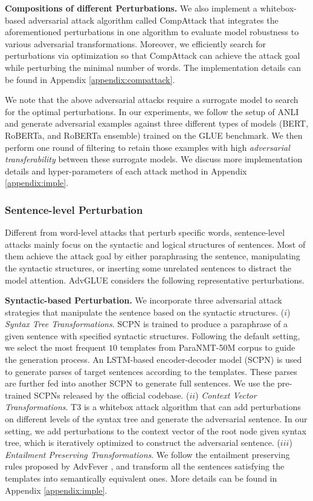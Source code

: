 \documentclass{article}
\newcommand{\method}{AdvGLUE\xspace}
\begin{document}
\textbf{Compositions of different Perturbations.} We also implement a whitebox-based adversarial attack algorithm called CompAttack that integrates the aforementioned perturbations in one algorithm to evaluate model robustness to various adversarial transformations. Moreover, we efficiently search for perturbations via optimization so that CompAttack can achieve the attack goal while perturbing the minimal number of words. The implementation details can be found in Appendix \ref{appendix:compattack}.


We note that the above adversarial attacks require a surrogate model to search for the optimal perturbations. In our experiments, we follow the setup of ANLI \citep{anli} and generate adversarial examples against three different types of  models (BERT, RoBERTa, and RoBERTa ensemble) trained on the GLUE benchmark. 
We then perform one round of filtering to retain those examples with high \textit{adversarial transferability} between these surrogate models. 
We discuss more implementation details and hyper-parameters of each attack method in Appendix \ref{appendix:imple}.

\subsubsection{Sentence-level Perturbation}
Different from word-level attacks that perturb specific words, sentence-level attacks mainly focus on the syntactic and logical structures of  sentences. Most of them achieve the attack goal by either paraphrasing the sentence,  manipulating the syntactic structures, or inserting some unrelated sentences to distract the model
attention. \method considers the following representative perturbations.

\textbf{Syntactic-based Perturbation.} We incorporate three adversarial attack strategies that manipulate the sentence based on the syntactic structures. ($i$) \textit{Syntax Tree Transformations}. SCPN \citep{scpn} is trained to produce a paraphrase of a given sentence with specified syntactic structures. Following the default setting, we select the most frequent $10$ templates from ParaNMT-50M corpus \cite{wieting2017paranmt} to guide the generation process. An LSTM-based encoder-decoder model (SCPN) is used to generate parses of target sentences according to the templates. These parses are further fed into another SCPN to generate full sentences. We use the pre-trained SCPNs released by the official codebase. ($ii$) \textit{Context Vector Transformations}. T3 \citep{t3} is a whitebox attack algorithm that can add perturbations on different levels of the syntax tree and generate the adversarial sentence.
In our setting, we add perturbations to the context vector of the root node given syntax tree, which is iteratively optimized to construct the adversarial sentence. 
($iii$) \textit{Entailment Preserving Transformations}. We follow the entailment preserving rules proposed by AdvFever \citep{advfever}, and transform all the sentences satisfying the templates into semantically equivalent ones. More details can be found in Appendix \ref{appendix:imple}. 
\end{document}
